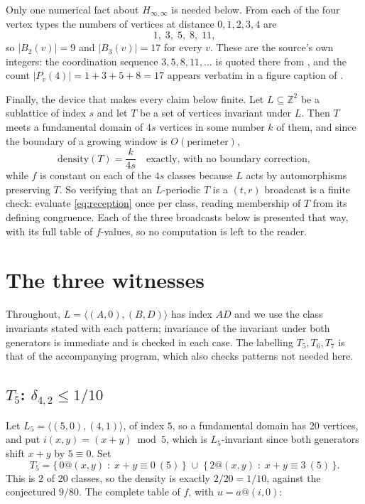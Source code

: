 \documentclass[11pt]{amsart}
\theoremstyle{definition}
\begin{document}
Only one numerical fact about $H_{\infty,\infty}$ is needed below. From each of the four vertex
types the numbers of vertices at distance $0,1,2,3,4$ are
\begin{equation}\label{eq:shells}
  1,\;3,\;5,\;8,\;11,
\end{equation}
so $|B_2(v)|=9$ and $|B_3(v)|=17$ for every $v$. These are the source's own integers: the
coordination sequence $3,5,8,11,\dots$ is quoted there from \cite{OEIS}, and the count
$|P_v(4)|=1+3+5+8=17$ appears verbatim in a figure caption of \cite{CervantesHarris}.

Finally, the device that makes every claim below finite. Let $L\subseteq\mathbb{Z}^2$ be a
sublattice of index $s$ and let $T$ be a set of vertices invariant under $L$. Then $T$ meets a
fundamental domain of $4s$ vertices in some number $k$ of them, and since the boundary of a
growing window is $O(\text{perimeter})$,
\begin{equation}\label{eq:density}
  \text{density}(T)=\frac{k}{4s}\quad\text{exactly, with no boundary correction},
\end{equation}
while $f$ is constant on each of the $4s$ classes because $L$ acts by automorphisms preserving
$T$. So verifying that an $L$-periodic $T$ is a $(t,r)$ broadcast is a finite check: evaluate
\eqref{eq:reception} once per class, reading membership of $T$ from its defining congruence.
Each of the three broadcasts below is presented that way, with its full table of $f$-values, so
no computation is left to the reader.

\section{The three witnesses}\label{sec:beat}

Throughout, $L=\langle(A,0),(B,D)\rangle$ has index $AD$ and we use the class invariants stated
with each pattern; invariance of the invariant under both generators is immediate and is checked
in each case. The labelling $T_5,T_6,T_7$ is that of the accompanying program, which also checks
patterns not needed here.

\subsection*{$T_5$: $\delta_{4,2}\leq 1/10$}
Let $L_5=\langle(5,0),(4,1)\rangle$, of index $5$, so a fundamental domain has $20$ vertices,
and put $i(x,y)=(x+y)\bmod 5$, which is $L_5$-invariant since both generators shift $x+y$ by
$5\equiv 0$. Set
\[
  \boxed{\;T_5=\bigl\{\,0@(x,y)\;:\;x+y\equiv 0\ (5)\,\bigr\}\;\cup\;
              \bigl\{\,2@(x,y)\;:\;x+y\equiv 3\ (5)\,\bigr\}.\;}
\]
This is $2$ of $20$ classes, so the density is exactly $2/20=1/10$, against the conjectured
$9/80$. The complete table of $f$, with $u=a@(i,0)$:
\end{document}
